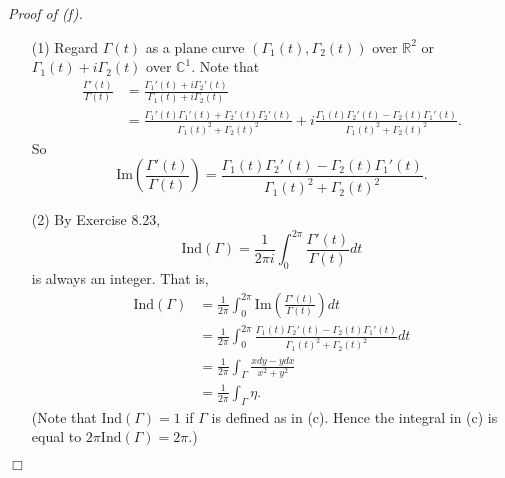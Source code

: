 \documentclass{article}
\begin{document}
\emph{Proof of (f).}
\begin{enumerate}
\item[(1)]
  Regard $\Gamma(t)$ as a plane curve $(\Gamma_1(t), \Gamma_2(t))$ over $\mathbb{R}^2$
  or $\Gamma_1(t) + i \Gamma_2(t)$ over $\mathbb{C}^1$.
  Note that
  \begin{align*}
    \frac{\Gamma'(t)}{\Gamma(t)}
    &= \frac{\Gamma_1'(t) + i \Gamma_2'(t)}{\Gamma_1(t) + i \Gamma_2(t)} \\
    &= \frac{\Gamma_1'(t) \Gamma_1'(t) + \Gamma_2'(t) \Gamma_2'(t)}
      {\Gamma_1(t)^2 + \Gamma_2(t)^2}
      + i \frac{\Gamma_1(t) \Gamma_2'(t) - \Gamma_2(t) \Gamma_1'(t)}
      {\Gamma_1(t)^2 + \Gamma_2(t)^2}.
  \end{align*}
  So
  \[
    \mathrm{Im}\left(\frac{\Gamma'(t)}{\Gamma(t)}\right)
    = \frac{\Gamma_1(t) \Gamma_2'(t) - \Gamma_2(t) \Gamma_1'(t)}
      {\Gamma_1(t)^2 + \Gamma_2(t)^2}.
  \]

\item[(2)]
  By Exercise 8.23,
  \[
    \mathrm{Ind}(\Gamma)
    = \frac{1}{2\pi i}\int_{0}^{2\pi} \frac{\Gamma'(t)}{\Gamma(t)} dt
  \]
  is always an integer.
  That is,
  \begin{align*}
    \mathrm{Ind}(\Gamma)
    &= \frac{1}{2\pi}\int_{0}^{2\pi} \mathrm{Im}\left(\frac{\Gamma'(t)}{\Gamma(t)}\right) dt \\
    &= \frac{1}{2\pi}\int_{0}^{2\pi}
      \frac{\Gamma_1(t) \Gamma_2'(t) - \Gamma_2(t) \Gamma_1'(t)}
        {\Gamma_1(t)^2 + \Gamma_2(t)^2} dt \\
    &= \frac{1}{2\pi}\int_{\Gamma} \frac{xdy - ydx}{x^2+y^2} \\
    &= \frac{1}{2\pi}\int_{\Gamma} \eta.
  \end{align*}
  (Note that $\mathrm{Ind}(\Gamma) = 1$ if $\Gamma$ is defined as in (c).
  Hence the integral in (c) is equal to $2\pi \mathrm{Ind}(\Gamma) = 2\pi$.)
\end{enumerate}
$\Box$ \\\\



\end{document}
